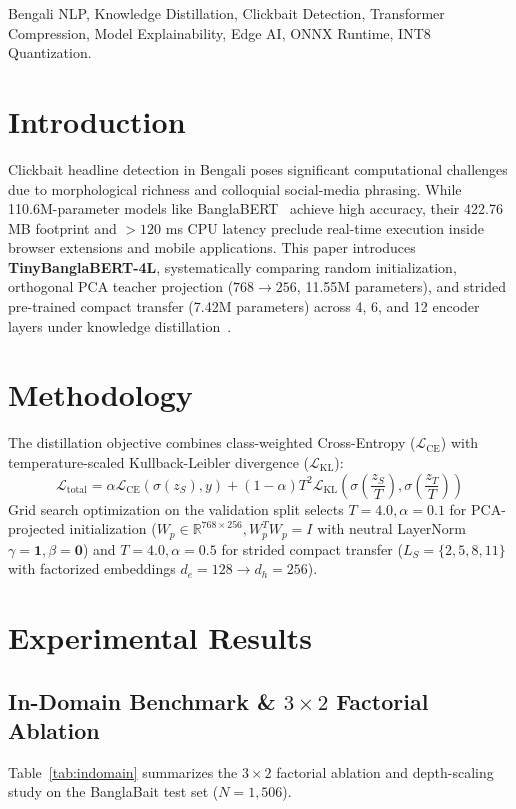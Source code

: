 \documentclass[conference]{IEEEtran}
\begin{document}
\begin{IEEEkeywords}
Bengali NLP, Knowledge Distillation, Clickbait Detection, Transformer Compression, Model Explainability, Edge AI, ONNX Runtime, INT8 Quantization.
\end{IEEEkeywords}

\section{Introduction}
Clickbait headline detection in Bengali poses significant computational challenges due to morphological richness and colloquial social-media phrasing. While 110.6M-parameter models like BanglaBERT~\cite{b1} achieve high accuracy, their 422.76 MB footprint and $>120$ ms CPU latency preclude real-time execution inside browser extensions and mobile applications. This paper introduces \textbf{TinyBanglaBERT-4L}, systematically comparing random initialization, orthogonal PCA teacher projection ($768 \to 256$, 11.55M parameters), and strided pre-trained compact transfer (7.42M parameters) across 4, 6, and 12 encoder layers under knowledge distillation~\cite{b2,b3}.

\section{Methodology}
The distillation objective combines class-weighted Cross-Entropy ($\mathcal{L}_{\text{CE}}$) with temperature-scaled Kullback-Leibler divergence ($\mathcal{L}_{\text{KL}}$):
\begin{equation}
\mathcal{L}_{\text{total}} = \alpha \mathcal{L}_{\text{CE}}\left(\sigma(z_S), y\right) + (1 - \alpha) T^2 \mathcal{L}_{\text{KL}}\left(\sigma\left(\frac{z_S}{T}\right), \sigma\left(\frac{z_T}{T}\right)\right)
\end{equation}
Grid search optimization on the validation split selects $T=4.0, \alpha=0.1$ for PCA-projected initialization ($W_p \in \mathbb{R}^{768 \times 256}, W_p^T W_p = I$ with neutral LayerNorm $\gamma=\mathbf{1}, \beta=\mathbf{0}$) and $T=4.0, \alpha=0.5$ for strided compact transfer ($L_S = \{2, 5, 8, 11\}$ with factorized embeddings $d_e=128 \to d_h=256$).

\section{Experimental Results}

\subsection{In-Domain Benchmark \& $3 \times 2$ Factorial Ablation}
Table~\ref{tab:indomain} summarizes the $3 \times 2$ factorial ablation and depth-scaling study on the BanglaBait test set ($N=1,506$).
\end{document}
